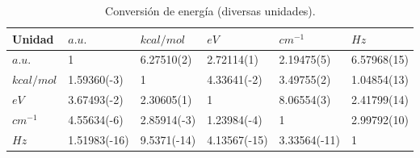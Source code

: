 \begin{table}[H]
  \myfloatalign
  \footnotesize
  \begin{tabularx}{\textwidth}{XXXXXX} \toprule
   Unidad      & $a.u.$ & $kcal/mol$  & $eV$        & $cm^{-1}$    & $Hz$        \\ \midrule%
    $a.u.$     & 1      & 6.27510(2) & 2.72114(1) & 2.19475(5) & 6.57968(15) \\ \midrule%
    $kcal/mol$ & 1.59360(-3) & 1     & 4.33641(-2)& 3.49755(2) & 1.04854(13) \\ \midrule%
    $eV$       & 3.67493(-2) & 2.30605(1) & 1     & 8.06554(3) & 2.41799(14) \\ \midrule%
    $cm^{-1}$   & 4.55634(-6) & 2.85914(-3) & 1.23984(-4) & 1   & 2.99792(10) \\ \midrule%
    $Hz$       & 1.51983(-16)& 9.5371(-14) & 4.13567(-15) & 3.33564(-11) & 1  \\ %
    \bottomrule
  \end{tabularx}%
  \caption{Conversión de energía (diversas unidades).}
  \label{tab:AU-SI}
\end{table}











